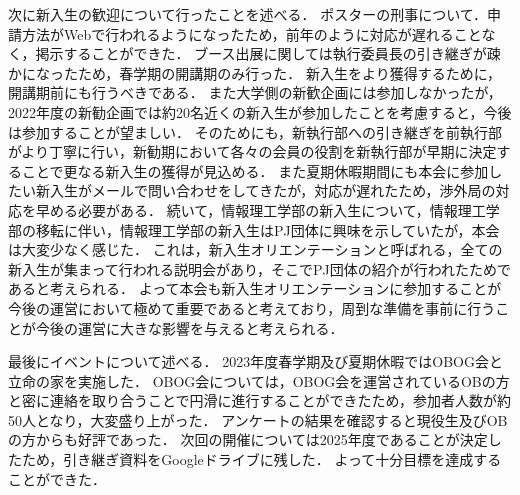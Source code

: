 次に新入生の歓迎について行ったことを述べる．
ポスターの刑事について．申請方法がWebで行われるようになったため，前年のように対応が遅れることなく，掲示することができた．
ブース出展に関しては執行委員長の引き継ぎが疎かになったため，春学期の開講期のみ行った．
新入生をより獲得するために，開講期前にも行うべきである．
また大学側の新歓企画には参加しなかったが，2022年度の新勧企画では約20名近くの新入生が参加したことを考慮すると，今後は参加することが望ましい．
そのためにも，新執行部への引き継ぎを前執行部がより丁寧に行い，新勧期において各々の会員の役割を新執行部が早期に決定することで更なる新入生の獲得が見込める．
また夏期休暇期間にも本会に参加したい新入生がメールで問い合わせをしてきたが，対応が遅れたため，渉外局の対応を早める必要がある．
続いて，情報理工学部の新入生について，情報理工学部の移転に伴い，情報理工学部の新入生はPJ団体に興味を示していたが，本会は大変少なく感じた．
これは，新入生オリエンテーションと呼ばれる，全ての新入生が集まって行われる説明会があり，そこでPJ団体の紹介が行われたためであると考えられる．
よって本会も新入生オリエンテーションに参加することが今後の運営において極めて重要であると考えており，周到な準備を事前に行うことが今後の運営に大きな影響を与えると考えられる．

最後にイベントについて述べる．
2023年度春学期及び夏期休暇ではOBOG会と立命の家を実施した．
OBOG会については，OBOG会を運営されているOBの方と密に連絡を取り合うことで円滑に進行することができたため，参加者人数が約50人となり，大変盛り上がった．
アンケートの結果を確認すると現役生及びOBの方からも好評であった．
次回の開催については2025年度であることが決定したため，引き継ぎ資料をGoogleドライブに残した．
よって十分目標を達成することができた．
